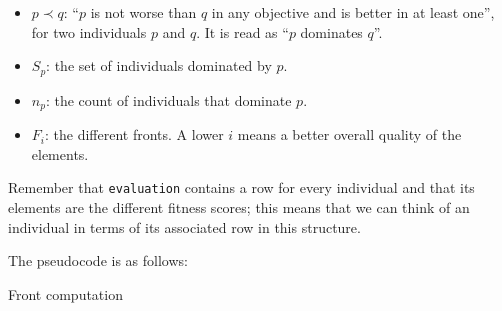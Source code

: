 	\begin{itemize}

		\item
		$p \prec q$: ``$p$ is not worse than $q$ in any objective and is better in at least one'', for two individuals $p$ and $q$. It is read as ``$p$ dominates $q$''.

		\item
		$S_p$: the set of individuals dominated by $p$.

		\item
		$n_p$: the count of individuals that dominate $p$.

		\item
		$F_i$: the different fronts. A lower $i$ means a better overall quality of the elements.

	\end{itemize}

	Remember that \texttt{evaluation} contains a row for every individual and that its elements are the different fitness scores; this means that we can think of an individual in terms of its associated row in this structure.

\newpage

	The pseudocode is as follows:

	\vspace{0.3cm}

	\begin{algorithm}[H]


		\caption{Front computation}

	\end{algorithm}

